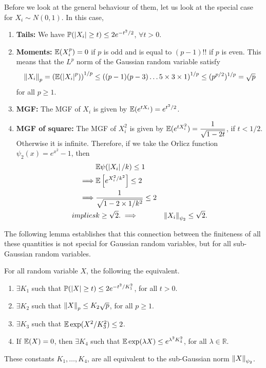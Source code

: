 \documentclass[12pt]{article}
\begin{document}
Before we look at the general behaviour of them, let us look at the special case for $X_i \sim N(0, 1)$. In this case,
\begin{enumerate}
    \item \textbf{Tails:} We have $\mathbb{P}(|X_i| \geq t) \leq 2e^{-t^2/2}$, $\forall t > 0$.
    \item \textbf{Moments:} $\mathbb{E}(X_i^p) = 0$ if $p$ is odd and is equal to $(p-1)!!$ if $p$ is even. This means that the $L^p$ norm of the Gaussian random variable satisfy
          \begin{equation*}
              \left\Vert X_i \right\Vert_p = \left( \mathbb{E}(\left\lvert X_i \right\rvert^p) \right)^{1/p} \leq \left( (p-1)(p-3)\dots 5\times 3 \times 1 \right)^{1/p} \leq (p^{p/2})^{1/p} = \sqrt{p}
          \end{equation*}
          \noindent for all $p \geq 1$.
    \item \textbf{MGF:} The MGF of $X_i$ is given by $\mathbb{E}(e^{tX_i}) = e^{t^2/2}$.
    \item \textbf{MGF of square:} The MGF of $X_i^2$ is given by $\mathbb{E}(e^{tX_i^2}) = \dfrac{1}{\sqrt{1-2t}}$, if $t < 1/2$. Otherwise it is infinite. Therefore, if we take the Orlicz function $\psi_2(x) = e^{x^2} -1$, then
          \begin{align*}
                       & \mathbb{E}\psi(\left\lvert X_i \right\rvert/k) \leq 1                  \\
              \implies & \mathbb{E}\left[ e^{X_i^2/k^2} \right] \leq 2       \\
              \implies & \dfrac{1}{\sqrt{1 - 2 \times 1/k^2}} \leq 2 \\
              implies  & k \geq \sqrt{2}.
              \implies & \left\Vert X_i \right\Vert_{\psi_2} \leq \sqrt{2}.
          \end{align*}
\end{enumerate}

The following lemma establishes that this connection between the finiteness of all these quantities is not special for Gaussian random variables, but for all sub-Gaussian random variables.

\begin{lemma}
    For all random variable $X$, the following the equivalent.
    \begin{enumerate}
        \item $\exists K_1$ such that $\mathbb{P}(\left\lvert X \right\rvert \geq t) \leq 2 e^{-t^2/K_1^2}$, for all $t > 0$.
        \item $\exists K_2$ such that $\left\Vert X \right\Vert_p \leq K_2 \sqrt{p}$, for all $p \geq 1$.
        \item $\exists K_3$ such that $\mathbb{E}\exp(X^2/K_3^2) \leq 2$.
        \item If $\mathbb{E}(X) = 0$, then $\exists K_4$ such that $\mathbb{E}\exp(\lambda X) \leq e^{\lambda^2 K_4^2}$, for all $\lambda \in \mathbb{R}$.
    \end{enumerate}
    \noindent These constants $K_1, \dots, K_4$, are all equivalent to the sub-Gaussian norm $\left\Vert X \right\Vert_{\psi_2}$.
\end{lemma}
\end{document}
